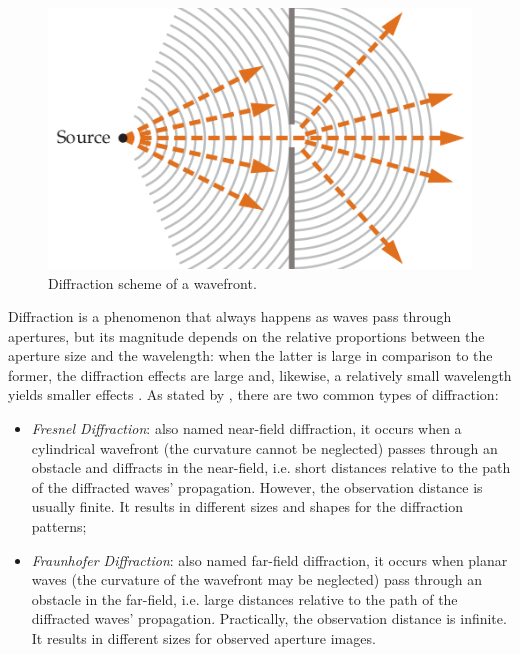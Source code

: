 \begin{figure}[htbp]
	\centering
	\caption{\label{fig:diffraction} Diffraction scheme of a wavefront.}
	\begin{center}
	    \includegraphics[scale=1.9]{images/diffraction.png}
	\end{center}
	\centering
\end{figure}

Diffraction is a phenomenon that always happens as waves pass through apertures, but its magnitude depends on the relative proportions between the aperture size and the wavelength: when the latter is large in comparison to the former, the diffraction effects are large and, likewise, a relatively small wavelength yields smaller effects \cite{tipler2007physics}. As stated by , there are two common types of diffraction:

\begin{itemize}
    \item \emph{Fresnel Diffraction}: also named near-field diffraction, it occurs when a cylindrical wavefront (the curvature cannot be neglected) passes through an obstacle and diffracts in the near-field, i.e. short distances relative to the path of the diffracted waves' propagation. However, the observation distance is usually finite. It results in different sizes and shapes for the diffraction patterns;
    
    \item \emph{Fraunhofer Diffraction}: also named far-field diffraction, it occurs when planar waves (the curvature of the wavefront may be neglected) pass through an obstacle in the far-field, i.e. large distances relative to the path of the diffracted waves' propagation. Practically, the observation distance is infinite. It results in different sizes for observed aperture images.
    
\end{itemize}

